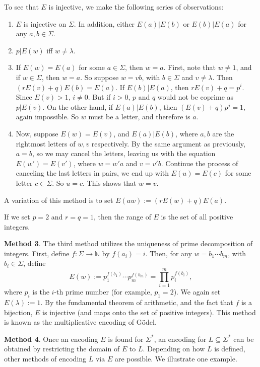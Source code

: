 \documentclass[12pt]{article}
\begin{document}
To see that $E$ is injective, we make the following series of observations:
\begin{enumerate}
\item $E$ is injective on $\Sigma$.  In addition, either $E(a)|E(b)$ or $E(b)|E(a)$ for any $a,b\in \Sigma$. 
\item $p|E(w)$ iff $w\ne \lambda$.  
\item If $E(w)=E(a)$ for some $a\in \Sigma$, then $w=a$.  First, note that $w\ne 1$, and if $w\in \Sigma$, then $w=a$.  So suppose $w=vb$, with $b\in \Sigma$ and $v\ne \lambda$.  Then $(rE(v)+q)E(b)=E(a)$.  If $E(b)|E(a)$, then $rE(v)+q = p^i$.  Since $E(v)>1$, $i\ne 0$.  But if $i>0$, $p$ and $q$ would not be coprime as $p|E(v)$.  On the other hand, if $E(a)|E(b)$, then $(E(v)+q)p^j = 1$, again impossible.  So $w$ must be a letter, and therefore is $a$.
\item Now, suppose $E(w)=E(v)$, and $E(a)|E(b)$, where $a,b$ are the rightmost letters of $w,v$ respectively.  By the same argument as previously, $a=b$, so we may cancel the letters, leaving us with the equation $E(w')=E(v')$, where $w=w'a$ and $v=v'b$.  Continue the process of canceling the last letters in pairs, we end up with $E(u)=E(c)$ for some letter $c\in \Sigma$.  So $u=c$.  This shows that $w=v$.
\end{enumerate}

A variation of this method is to set $E(aw):=(rE(w)+q)E(a)$.

If we set $p=2$ and $r=q=1$, then the range of $E$ is the set of all positive integers.

\textbf{Method 3}.  The third method utilizes the uniqueness of prime decomposition of integers.  First, define $f:\Sigma \to \mathbb{N}$ by $f(a_i)=i$.  Then, for any $w = b_1 \cdots b_m$, with $b_i\in \Sigma$, define $$E(w):= p_1 ^{f(b_1)} \cdots p_m^{f(b_m)}=\prod_{i=1}^m p_i^{f(b_i)},$$
where $p_i$ is the $i$-th prime number (for example, $p_1=2$).  We again set $E(\lambda):=1$.  By the fundamental theorem of arithmetic, and the fact that $f$ is a bijection, $E$ is injective (and maps onto the set of positive integers).  This method is known as the multiplicative encoding of G\"odel.

\textbf{Method 4}.  Once an encoding $E$ is found for $\Sigma^*$, an encoding for $L\subseteq \Sigma^*$ can be obtained by restricting the domain of $E$ to $L$.  Depending on how $L$ is defined, other methods of encoding $L$ via $E$ are possible.  We illustrate one example.
\end{document}
